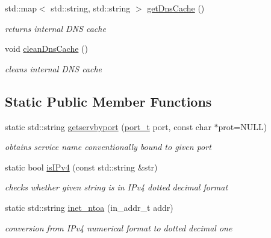 \begin{CompactItemize}
std::map$<$ std::string, std::string $>$ \hyperlink{classsocketpp_1_1AddrHandler_4e10f2291b27d7db2a2860502721f960}{getDnsCache} ()
\begin{CompactList}\small\item\em returns internal DNS cache \item\end{CompactList}\item 
void \hyperlink{classsocketpp_1_1AddrHandler_89a2929af6c042fd7e16661303dfabcb}{cleanDnsCache} ()
\begin{CompactList}\small\item\em cleans internal DNS cache \item\end{CompactList}\end{CompactItemize}
\subsection*{Static Public Member Functions}
\begin{CompactItemize}
\item 
static std::string \hyperlink{classsocketpp_1_1AddrHandler_f221cac56bf3808494806d335a56bb87}{getservbyport} (\hyperlink{namespacesocketpp_5517ef80f249b891a2ba64b95fc1e723}{port\_\-t} port, const char $\ast$prot=NULL)
\begin{CompactList}\small\item\em obtains service name conventionally bound to given port \item\end{CompactList}\item 
static bool \hyperlink{classsocketpp_1_1AddrHandler_652e24c273f7905cebf8d04b3cfef74d}{isIPv4} (const std::string \&str)
\begin{CompactList}\small\item\em checks whether given string is in IPv4 dotted decimal format \item\end{CompactList}\item 
static std::string \hyperlink{classsocketpp_1_1AddrHandler_a4377d84c8ea976aeada2b2eb0ac248d}{inet\_\-ntoa} (in\_\-addr\_\-t addr)
\begin{CompactList}\small\item\em conversion from IPv4 numerical format to dotted decimal one \item\end{CompactList}\end{CompactItemize}


